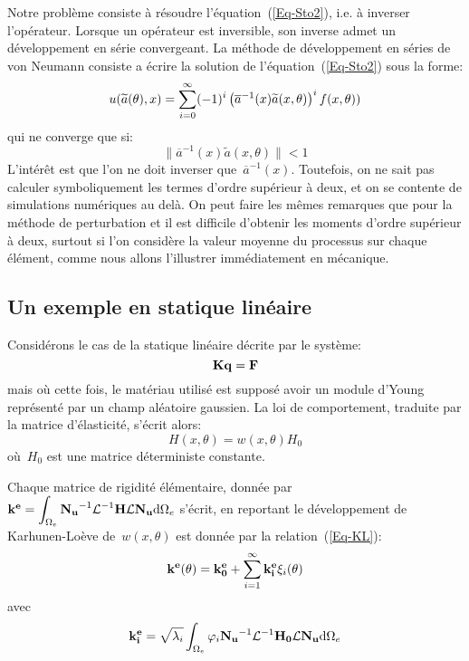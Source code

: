 Notre problème consiste à résoudre l'équation~(\ref{Eq-Sto2}), i.e. à inverser l'opérateur.
Lorsque un opérateur est inversible, son inverse admet un développement en série convergeant.
La méthode de développement en séries de von Neumann consiste a écrire la solution de l'équation~(\ref{Eq-Sto2}) sous la forme:
\begin{equation}\label{Eq-StoNeu}
u(\widetilde{a}(\theta),x)=\displaystyle\sum_{i=0}^\infty (-1)^i \begin{pmatrix}\overline{a}^{-1}(x)\widetilde{a}(x,\theta)\end{pmatrix}^i f(x,\theta))
\end{equation}
qui ne converge que si:
\begin{equation}
\|\overline{a}^{-1}(x)\widetilde{a}(x,\theta)\| <1
\end{equation}
L'intérêt est que l'on ne doit inverser que~$\overline{a}^{-1}(x)$.
Toutefois, on ne sait pas calculer symboliquement les termes d'ordre supérieur à deux, et on se contente de simulations numériques au delà.
On peut faire les mêmes remarques que pour la méthode de perturbation et il est difficile d'obtenir les moments d'ordre supérieur à deux, surtout si l'on considère la valeur moyenne du processus sur chaque élément, comme nous allons l'illustrer immédiatement en mécanique.

\medskip
\subsection{Un exemple en statique linéaire}

Considérons le cas de la statique linéaire décrite par le système:
$$ \MM{K}\VV{q}=\VV{F} $$
mais où cette fois, le matériau utilisé est supposé avoir un module d'Young représenté par un champ aléatoire gaussien.
La loi de comportement, traduite par la matrice d'élasticité, s'écrit alors:
\begin{equation}
H(x,\theta)=w(x,\theta)H_0
\end{equation}
où~$H_0$ est une matrice déterministe constante.

Chaque matrice de rigidité élémentaire, donnée par~$\MM{k^e}=\dint_{\Omega_e} \MMI{N_u}\MMI{\mathcal{L}}\MM{H}\MM{\mathcal{L}}\MM{N_u} \dd\Omega_e$ s'écrit, en reportant le développement de Karhunen-Loève de~$w(x,\theta)$ est donnée par la relation~(\ref{Eq-KL}):
\begin{equation}
\MM{k^e(\theta)}=\MM{k^e_0} +\dsum_{i=1}^\infty \MM{k_i^e}\xi_i(\theta)
\end{equation}
avec
\begin{equation}
\MM{k_i^e}=\sqrt{\lambda_i}\dint_{\Omega_e} \varphi_i\MMI{N_u}\MMI{\mathcal{L}}\MM{H_0}\MM{\mathcal{L}}\MM{N_u} \dd\Omega_e
\end{equation}

